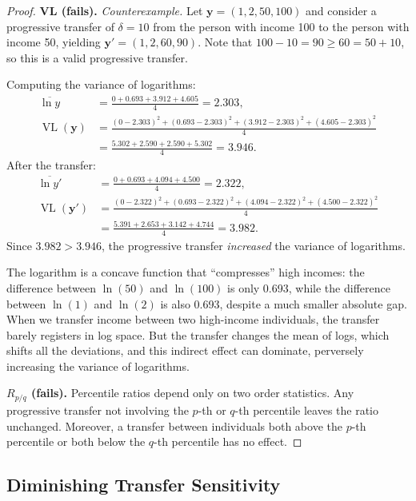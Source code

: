 \documentclass[12pt]{article}
\theoremstyle{plain}
\theoremstyle{definition}
\theoremstyle{remark}
\newcommand{\bfy}{\mathbf{y}}
\begin{document}
\begin{proof}
\textbf{VL (fails).}
\emph{Counterexample.}
Let $\bfy = (1, 2, 50, 100)$ and consider a progressive transfer of $\delta = 10$ from the person with income 100 to the person with income 50, yielding $\bfy' = (1, 2, 60, 90)$.
Note that $100 - 10 = 90 \geq 60 = 50 + 10$, so this is a valid progressive transfer.

Computing the variance of logarithms:
\begin{align*}
\overline{\ln y} &= \frac{0 + 0.693 + 3.912 + 4.605}{4} = 2.303,\\
\operatorname{VL}(\bfy) &= \frac{(0-2.303)^2 + (0.693-2.303)^2 + (3.912-2.303)^2 + (4.605-2.303)^2}{4} \\
&= \frac{5.302 + 2.590 + 2.590 + 5.302}{4} = 3.946.
\end{align*}
After the transfer:
\begin{align*}
\overline{\ln y'} &= \frac{0 + 0.693 + 4.094 + 4.500}{4} = 2.322,\\
\operatorname{VL}(\bfy') &= \frac{(0-2.322)^2 + (0.693-2.322)^2 + (4.094-2.322)^2 + (4.500-2.322)^2}{4} \\
&= \frac{5.391 + 2.653 + 3.142 + 4.744}{4} = 3.982.
\end{align*}
Since $3.982 > 3.946$, the progressive transfer \emph{increased} the variance of logarithms.

The logarithm is a concave function that ``compresses'' high incomes: the difference between $\ln(50)$ and $\ln(100)$ is only 0.693, while the difference between $\ln(1)$ and $\ln(2)$ is also 0.693, despite a much smaller absolute gap.
When we transfer income between two high-income individuals, the transfer barely registers in log space.
But the transfer changes the mean of logs, which shifts all the deviations, and this indirect effect can dominate, perversely increasing the variance of logarithms.

\textbf{$R_{p/q}$ (fails).}
Percentile ratios depend only on two order statistics.
Any progressive transfer not involving the $p$-th or $q$-th percentile leaves the ratio unchanged.
Moreover, a transfer between individuals both above the $p$-th percentile or both below the $q$-th percentile has no effect.
\end{proof}

\subsection{Diminishing Transfer Sensitivity}
\end{document}
